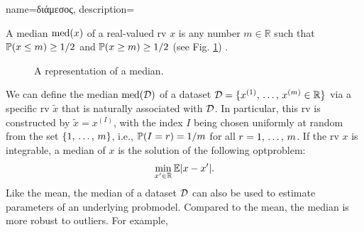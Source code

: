 {name={\foreignlanguage{greek}{διάμεσος}},
	description={A median $\mathrm{med}(x)$ of a real-valued \gls{rv} $x$ 
		is any number $m \in \mathbb{R}$ such that $\mathbb{P}({ x \leq m}) \geq 1/2$ and $\mathbb{P}({ x \geq m}) \geq 1/2$ 
		(see Fig. \ref{fig_median1_dict}) \cite{LC}. 
 		\begin{figure}[H]
			\begin{center}
			\end{center}
			\caption{A representation of a median. \label{fig_median1_dict}}
 		\end{figure}  
 		We can define the median $\mathrm{med}(\mathcal{D})$ 
 		of a \gls{dataset} $\mathcal{D} = \{ x^{(1)}, \,\ldots, \,x^{(m)} \in \mathbb{R} \}$ 
 		via a specific \gls{rv} $\tilde{x}$ that is naturally associated with $\mathcal{D}$. 
 		In particular, this \gls{rv} is constructed by $\tilde{x} = x^{(I)}$, with the index $I$ 
 		being chosen uniformly at random from the set $\{1, \,\ldots, \,m\}$, i.e., $\mathbb{P}({I = r})=1/m$ for 
 		all $r=1, \,\ldots, \,m$. If the \gls{rv} $x$ is integrable, a median of $x$ 
 		is the solution of the following \gls{optproblem}: 
 		$$\min_{x' \in \mathbb{R}} \mathbb{E}{|x - x'|}.$$ 
 		Like the \gls{mean}, the median of a \gls{dataset} $\mathcal{D}$ can also be used 
 		to estimate \gls{parameter}s of an underlying \gls{probmodel}. Compared 
 		to the \gls{mean}, the median is more robust to \gls{outlier}s. For example, 
}}
